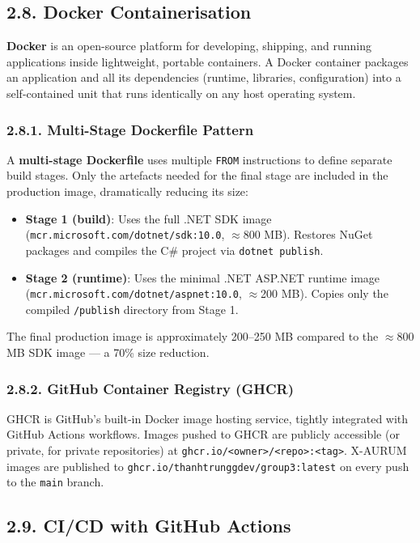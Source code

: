 \subsection{2.8. Docker Containerisation}

\textbf{Docker} is an open-source platform for developing, shipping, and running applications inside lightweight, portable containers. A Docker container packages an application and all its dependencies (runtime, libraries, configuration) into a self-contained unit that runs identically on any host operating system.

\subsubsection{2.8.1. Multi-Stage Dockerfile Pattern}
A \textbf{multi-stage Dockerfile} uses multiple \texttt{FROM} instructions to define separate build stages. Only the artefacts needed for the final stage are included in the production image, dramatically reducing its size:

\begin{itemize}
  \item \textbf{Stage 1 (build)}: Uses the full .NET SDK image (\texttt{mcr.microsoft.com/dotnet/sdk:10.0}, $\approx$800 MB). Restores NuGet packages and compiles the C\# project via \texttt{dotnet publish}.
  \item \textbf{Stage 2 (runtime)}: Uses the minimal .NET ASP.NET runtime image (\texttt{mcr.microsoft.com/dotnet/aspnet:10.0}, $\approx$200 MB). Copies only the compiled \texttt{/publish} directory from Stage 1.
\end{itemize}

The final production image is approximately 200--250 MB compared to the $\approx$800 MB SDK image --- a 70\% size reduction.

\subsubsection{2.8.2. GitHub Container Registry (GHCR)}
GHCR is GitHub's built-in Docker image hosting service, tightly integrated with GitHub Actions workflows. Images pushed to GHCR are publicly accessible (or private, for private repositories) at \texttt{ghcr.io/<owner>/<repo>:<tag>}. X-AURUM images are published to \texttt{ghcr.io/thanhtrunggdev/group3:latest} on every push to the \texttt{main} branch.

\subsection{2.9. CI/CD with GitHub Actions}

